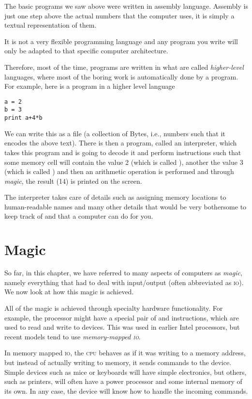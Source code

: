 The basic programs we saw above were written in assembly language. Assembly is
just one step above the actual numbers that the computer uses, it is simply a
textual representation of them.

It is not a very flexible programming language and any program you write will
only be adapted to that specific computer architecture.

Therefore, most of the time, programs are written in what are called
\emph{higher-level} languages, where most of the boring work is automatically
done by a program. For example, here is a program in a higher level language

\begin{verbatim}
a = 2
b = 3
print a+4*b
\end{verbatim}

We can write this as a file (a collection of Bytes, i.e., numbers such that it
encodes the above text). There is then a program, called an interpreter, which
takes this program and is going to decode it and perform instructions such that
some memory cell will contain the value 2 (which is called ), another
the value 3 (which is called ) and then an arithmetic operation is
performed and through \emph{magic}, the result (14) is printed on the screen.

The interpreter takes care of details such as assigning memory locations to
human-readable names and many other details that would be very bothersome to
keep track of and that a computer can do for you.

\section{Magic}

So far, in this chapter, we have referred to many aspects of computers as
\textit{magic}, namely everything that had to deal with input/output (often
abbreviated as \textsc{io}). We now look at how this magic is achieved.

All of the magic is achieved through specialty hardware functionality. For
example, the processor might have a special pair of  and
 instructions, which are used to read and write to devices.
This was used in earlier Intel processors, but recent models tend to use
\emph{memory-mapped \textsc{io}}.

In memory mapped \textsc{io}, the \textsc{cpu} behaves as if it was writing to
a memory address, but instead of actually writing to memory, it sends commands
to the device. Simple devices such as mice or keyboards will have simple
electronics, but others, such as printers, will often have a power processor
and some internal memory of its own. In any case, the device will know how to
handle the incoming commands.

